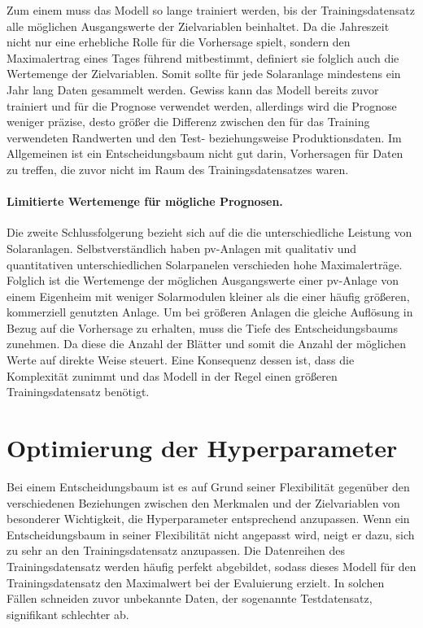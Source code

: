 \documentclass[12pt, a4paper]{article}
\begin{document}
Zum einem muss das Modell so lange trainiert werden, bis der Trainingsdatensatz alle möglichen Ausgangswerte der Zielvariablen beinhaltet. Da die Jahreszeit nicht nur eine erhebliche Rolle für die Vorhersage spielt, sondern den Maximalertrag eines Tages führend mitbestimmt, definiert sie folglich auch die Wertemenge der Zielvariablen. Somit sollte für jede Solaranlage mindestens ein Jahr lang Daten gesammelt werden. Gewiss kann das Modell bereits zuvor trainiert und für die Prognose verwendet werden, allerdings wird die Prognose weniger präzise, desto größer die Differenz zwischen den für das Training verwendeten Randwerten und den Test- beziehungsweise Produktionsdaten. Im Allgemeinen ist ein Entscheidungsbaum nicht gut darin, Vorhersagen für Daten zu treffen, die zuvor nicht im Raum des Trainingsdatensatzes waren.

\paragraph{Limitierte Wertemenge für mögliche Prognosen.}

Die zweite Schlussfolgerung bezieht sich auf die die unterschiedliche Leistung von Solaranlagen. Selbstverständlich haben \ac{pv}-Anlagen mit qualitativ und quantitativen unterschiedlichen Solarpanelen verschieden hohe Maximalerträge. Folglich ist die Wertemenge der möglichen Ausgangswerte einer \ac{pv}-Anlage von einem Eigenheim mit weniger Solarmodulen kleiner als die einer häufig größeren, kommerziell genutzten Anlage. Um bei größeren Anlagen die gleiche Auflösung in Bezug auf die Vorhersage zu erhalten, muss die Tiefe des Entscheidungsbaums zunehmen. Da diese die Anzahl der Blätter und somit die Anzahl der möglichen Werte auf direkte Weise steuert. Eine Konsequenz dessen ist, dass die Komplexität zunimmt und das Modell in der Regel einen größeren Trainingsdatensatz benötigt.

\newpage

\section{Optimierung der Hyperparameter}
\label{sec:hyperparameters}

Bei einem Entscheidungsbaum ist es auf Grund seiner Flexibilität gegenüber den verschiedenen Beziehungen zwischen den Merkmalen und der Zielvariablen von besonderer Wichtigkeit, die Hyperparameter entsprechend anzupassen. Wenn ein Entscheidungsbaum in seiner Flexibilität nicht angepasst wird, neigt er dazu, sich zu sehr an den Trainingsdatensatz anzupassen. Die Datenreihen des Trainingsdatensatz werden häufig perfekt abgebildet, sodass dieses Modell für den Trainingsdatensatz den Maximalwert bei der Evaluierung erzielt. In solchen Fällen schneiden zuvor unbekannte Daten, der sogenannte Testdatensatz, signifikant schlechter ab.
\end{document}
